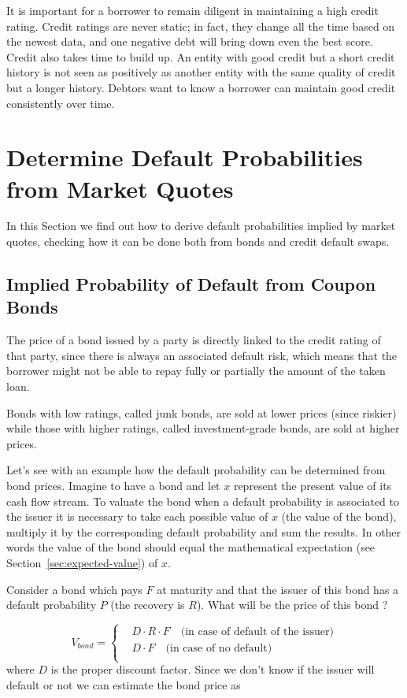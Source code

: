 It is important for a borrower to remain diligent in maintaining a high credit rating. Credit ratings are never static; in fact, they change all the time based on the newest data, and one negative debt will bring down even the best score. 
Credit also takes time to build up. An entity with good credit but a short credit history is not seen as positively as another entity with the same quality of credit but a longer history. Debtors want to know a borrower can maintain good credit consistently over time.

\section{Determine Default Probabilities from Market Quotes}
In this Section we find out how to derive default probabilities implied by market quotes, checking how it can be done both from bonds and credit default swaps.

\subsection{Implied Probability of Default from Coupon Bonds}\label{default-probabilities-and-bond-prices}

The price of a bond issued by a party is directly linked to the credit rating of that party, since there is always an associated default risk, which means that the borrower might not be able to repay fully or partially the amount of the taken loan. 

Bonds with low ratings, called junk bonds, are sold at lower prices (since riskier) while those with higher ratings, called investment-grade bonds, are sold at higher prices.

Let's see with an example how the default probability can be determined from bond prices. Imagine to have a bond and let \(x\) represent the present value of its cash flow stream. To valuate the bond when a default probability is associated to the issuer it is necessary to take each possible value of $x$ (the value of the bond), multiply it by the corresponding default probability and sum the results.  In other words the value of the bond should equal the mathematical expectation (see Section~\ref{sec:expected-value}) of $x$.

Consider a bond which pays $F$ at maturity and that the issuer of this bond has a default probability $P$ (the recovery is $R$). What will be the price of this bond ?

\begin{equation}
V_{bond} =
\begin{cases}
& D \cdot R \cdot F\quad\textrm{(in case of default of the issuer)}\\
&D \cdot F\quad\textrm{(in case of no default)}\\
\end{cases}\end{equation} 
where \(D\) is the proper discount factor. Since we don't
know if the issuer will default or not we can estimate the bond price as

